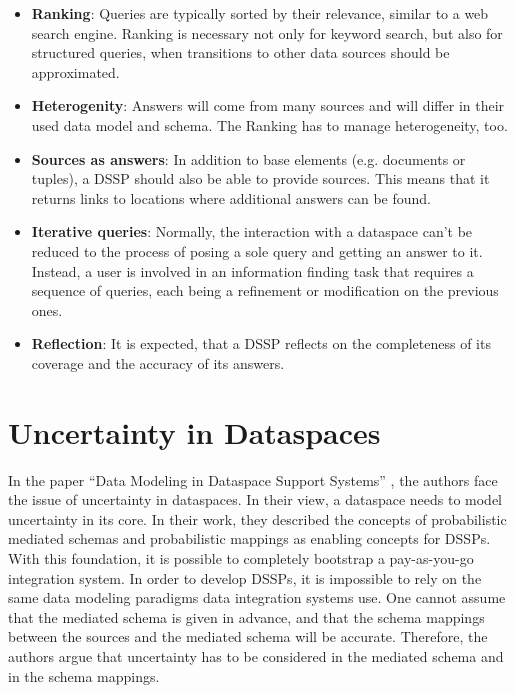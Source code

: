 \begin{itemize}
\item \textbf{Ranking}: Queries are typically sorted by their relevance, similar to a web search engine. Ranking is necessary not only for keyword search, but also for structured queries, when transitions to other data sources should be approximated.  

\item \textbf{Heterogenity}: Answers will come from many sources and will differ in their used data model and schema. The Ranking has to manage heterogeneity, too.

\item \textbf{Sources as answers}: In addition to base elements (e.g. documents or tuples), a DSSP should also be able to provide sources. This means that it returns links to locations where additional answers can be found.

\item \textbf{Iterative queries}: Normally, the interaction with a dataspace can't be reduced to the process of posing  a sole query and getting an answer to it. Instead, a user is involved in an information finding task that requires a sequence of queries, each being a refinement or modification on the previous ones.

\item \textbf{Reflection}: It is expected, that a DSSP reflects on the completeness of its coverage and the accuracy of its answers. 
\end{itemize}


\section{Uncertainty in Dataspaces}
 
In the paper ``Data Modeling in Dataspace Support Systems'' \cite{DBLP:conf/birthday/SarmaDH09}, the authors face the issue of uncertainty in dataspaces. In their view, a dataspace needs to model uncertainty in its core. In their work, they described the concepts of probabilistic mediated schemas and probabilistic mappings as enabling concepts for DSSPs. With this foundation, it is possible to completely bootstrap a pay-as-you-go integration system. 
In order to develop DSSPs, it is impossible to rely on the same data modeling paradigms data integration systems use. 
One cannot assume that the mediated schema is given in advance, and that the schema mappings between the sources and the mediated schema will be accurate. Therefore, the authors argue that uncertainty has to be considered in the mediated schema and in the schema mappings.

